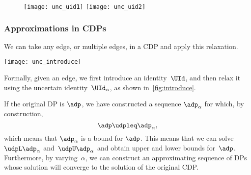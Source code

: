 \begin{figure}[b]
    \hfill
    \texttt{[image: unc\_uid1]}
    \hfill
    \texttt{[image: unc\_uid2]}
    \hfill
    \caption{}
    \label{fig:other}
\end{figure}

\vfill\pagebreak
\subsubsection{Approximations in CDPs}

We can take any edge, or multiple edges, in a CDP and apply this relaxation.

\begin{marginfigure}
    \texttt{[image: unc\_introduce]}
    \caption{}
    \label{fig:introduce}
\end{marginfigure}

Formally, given an edge, we first introduce an identity~$\UId$, and then relax it using the uncertain identity~$\UId_{\alpha}$,
as shown in~\cref{fig:introduce}.

If the original DP is $\adp$, we have constructed a sequence $\adp_\alpha$ for which, by construction,
\begin{equation}
    \adp\udpleq\adp_{\alpha},
\end{equation}
which means that $\adp_{\alpha}$ is a bound for  $\adp$.
This means that we can solve~$\udpL\adp_{\alpha}$ and~$\udpU\adp_{\alpha}$ and obtain upper and lower bounds for~$\adp$.
Furthermore, by varying~$\alpha$, we can construct an approximating sequence of DPs whose solution will converge to the solution of the original CDP.

%

